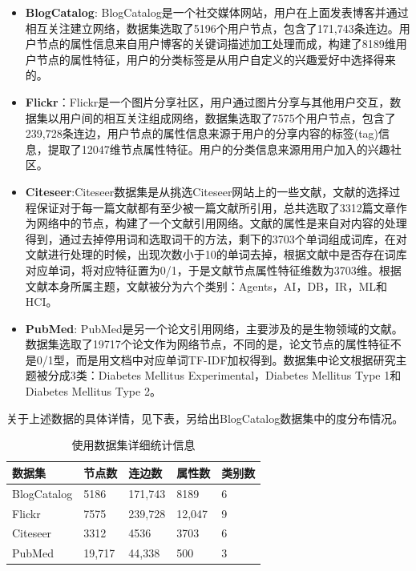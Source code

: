 \begin{itemize}
	\item \textbf{BlogCatalog}: BlogCatalog是一个社交媒体网站，用户在上面发表博客并通过相互关注建立网络，数据集选取了5196个用户节点，包含了171,743条连边。用户节点的属性信息来自用户博客的关键词描述加工处理而成，构建了8189维用户节点的属性特征，用户的分类标签是从用户自定义的兴趣爱好中选择得来的。
	
	\item \textbf{Flickr}：Flickr是一个图片分享社区，用户通过图片分享与其他用户交互，数据集以用户间的相互关注组成网络，数据集选取了7575个用户节点，包含了239,728条连边，用户节点的属性信息来源于用户的分享内容的标签(tag)信息，提取了12047维节点属性特征。用户的分类信息来源用用户加入的兴趣社区。
	
	\item \textbf{Citeseer}:Citeseer数据集是从挑选Citeseer网站上的一些文献，文献的选择过程保证对于每一篇文献都有至少被一篇文献所引用，总共选取了3312篇文章作为网络中的节点，构建了一个文献引用网络。文献的属性是来自对内容的处理得到，通过去掉停用词和选取词干的方法，剩下的3703个单词组成词库，在对文献进行处理的时候，出现次数小于10的单词去掉，根据文献中是否存在词库对应单词，将对应特征置为0/1，于是文献节点属性特征维数为3703维。根据文献本身所属主题，文献被分为六个类别：Agents，AI，DB，IR，ML和HCI。
	
	
	\item \textbf{PubMed}: PubMed是另一个论文引用网络，主要涉及的是生物领域的文献。数据集选取了19717个论文作为网络节点，不同的是，论文节点的属性特征不是0/1型，而是用文档中对应单词TF-IDF加权得到。数据集中论文根据研究主题被分成3类：Diabetes Mellitus Experimental，Diabetes Mellitus Type 1和Diabetes Mellitus Type 2。
	
\end{itemize}
关于上述数据的具体详情，见下表，另给出BlogCatalog数据集中的度分布情况。
\begin{table}
\centering
\caption{使用数据集详细统计信息}
\begin{tabular}{C{1in}C{1in}C{1in}C{1in}C{1in}}
\textbf{数据集} & \textbf{节点数} &\textbf{连边数} & \textbf{属性数}&\textbf{类别数}\\ \hline 
BlogCatalog & 5186  & 171,743 &8189&6\\
Flickr	& 7575 &239,728 & 12,047 & 9 \\
Citeseer& 3312 & 4536  &  3703 & 6 \\
PubMed & 19,717 &44,338&500 &3 \\
\hline
\end{tabular}
\end{table}

